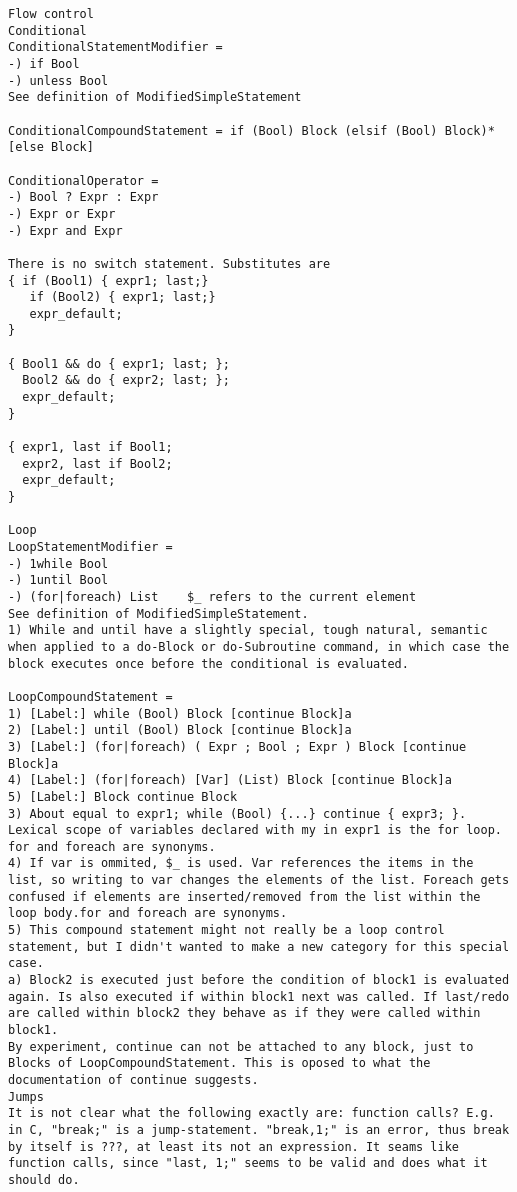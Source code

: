 \documentclass{article}
\begin{document}
\begin{description}
{\begin{verbatim}
Flow control
Conditional
ConditionalStatementModifier = 
-) if Bool
-) unless Bool
See definition of ModifiedSimpleStatement

ConditionalCompoundStatement = if (Bool) Block (elsif (Bool) Block)* [else Block]

ConditionalOperator =
-) Bool ? Expr : Expr
-) Expr or Expr
-) Expr and Expr

There is no switch statement. Substitutes are
{ if (Bool1) { expr1; last;}
   if (Bool2) { expr1; last;}
   expr_default;
}

{ Bool1 && do { expr1; last; };
  Bool2 && do { expr2; last; };
  expr_default;
}

{ expr1, last if Bool1;
  expr2, last if Bool2;
  expr_default;
}

Loop
LoopStatementModifier =  
-) 1while Bool
-) 1until Bool
-) (for|foreach) List    $_ refers to the current element
See definition of ModifiedSimpleStatement.
1) While and until have a slightly special, tough natural, semantic when applied to a do-Block or do-Subroutine command, in which case the block executes once before the conditional is evaluated.

LoopCompoundStatement =
1) [Label:] while (Bool) Block [continue Block]a
2) [Label:] until (Bool) Block [continue Block]a
3) [Label:] (for|foreach) ( Expr ; Bool ; Expr ) Block [continue Block]a   
4) [Label:] (for|foreach) [Var] (List) Block [continue Block]a
5) [Label:] Block continue Block 
3) About equal to expr1; while (Bool) {...} continue { expr3; }. Lexical scope of variables declared with my in expr1 is the for loop. for and foreach are synonyms.
4) If var is ommited, $_ is used. Var references the items in the list, so writing to var changes the elements of the list. Foreach gets confused if elements are inserted/removed from the list within the loop body.for and foreach are synonyms.
5) This compound statement might not really be a loop control statement, but I didn't wanted to make a new category for this special case.
a) Block2 is executed just before the condition of block1 is evaluated again. Is also executed if within block1 next was called. If last/redo are called within block2 they behave as if they were called within block1.
By experiment, continue can not be attached to any block, just to Blocks of LoopCompoundStatement. This is oposed to what the documentation of continue suggests. 
Jumps
It is not clear what the following exactly are: function calls? E.g. in C, "break;" is a jump-statement. "break,1;" is an error, thus break by itself is ???, at least its not an expression. It seams like function calls, since "last, 1;" seems to be valid and does what it should do.


\end{verbatim}}
\end{description}
\end{document}
